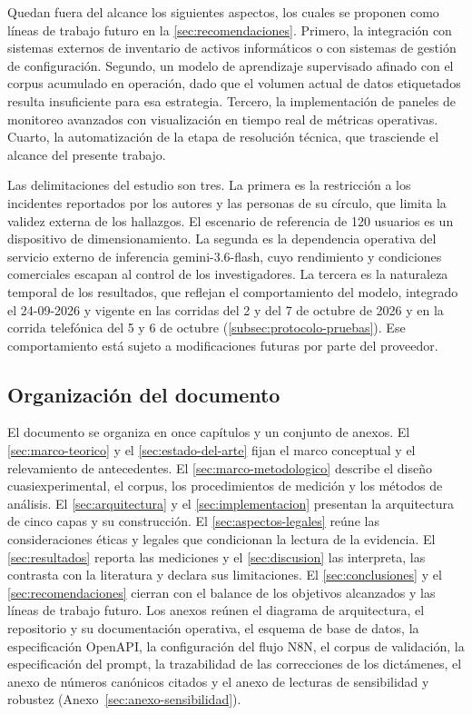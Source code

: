 Quedan fuera del alcance los siguientes aspectos, los cuales se proponen como líneas de trabajo futuro en la \autoref{sec:recomendaciones}. Primero, la integración con sistemas externos de inventario de activos informáticos o con sistemas de gestión de configuración. Segundo, un modelo de aprendizaje supervisado afinado con el corpus acumulado en operación, dado que el volumen actual de datos etiquetados resulta insuficiente para esa estrategia. Tercero, la implementación de paneles de monitoreo avanzados con visualización en tiempo real de métricas operativas. Cuarto, la automatización de la etapa de resolución técnica, que trasciende el alcance del presente trabajo.

Las delimitaciones del estudio son tres. La primera es la restricción a los incidentes reportados por los autores y las personas de su círculo, que limita la validez externa de los hallazgos. El escenario de referencia de 120 usuarios es un dispositivo de dimensionamiento. La segunda es la dependencia operativa del servicio externo de inferencia gemini-3.6-flash, cuyo rendimiento y condiciones comerciales escapan al control de los investigadores. La tercera es la naturaleza temporal de los resultados, que reflejan el comportamiento del modelo, integrado el 24-09-2026 y vigente en las corridas del 2 y del 7 de octubre de 2026 y en la corrida telefónica del 5 y 6 de octubre (\autoref{subsec:protocolo-pruebas}). Ese comportamiento está sujeto a modificaciones futuras por parte del proveedor.

\subsection{Organización del documento}\label{subsec:organizacion-documento}

El documento se organiza en once capítulos y un conjunto de anexos. El \autoref{sec:marco-teorico} y el \autoref{sec:estado-del-arte} fijan el marco conceptual y el relevamiento de antecedentes. El \autoref{sec:marco-metodologico} describe el diseño cuasiexperimental, el corpus, los procedimientos de medición y los métodos de análisis. El \autoref{sec:arquitectura} y el \autoref{sec:implementacion} presentan la arquitectura de cinco capas y su construcción. El \autoref{sec:aspectos-legales} reúne las consideraciones éticas y legales que condicionan la lectura de la evidencia. El \autoref{sec:resultados} reporta las mediciones y el \autoref{sec:discusion} las interpreta, las contrasta con la literatura y declara sus limitaciones. El \autoref{sec:conclusiones} y el \autoref{sec:recomendaciones} cierran con el balance de los objetivos alcanzados y las líneas de trabajo futuro. Los anexos reúnen el diagrama de arquitectura, el repositorio y su documentación operativa, el esquema de base de datos, la especificación OpenAPI, la configuración del flujo N8N, el corpus de validación, la especificación del prompt, la trazabilidad de las correcciones de los dictámenes, el anexo de números canónicos citados y el anexo de lecturas de sensibilidad y robustez (Anexo~\ref{sec:anexo-sensibilidad}).

\newpage
